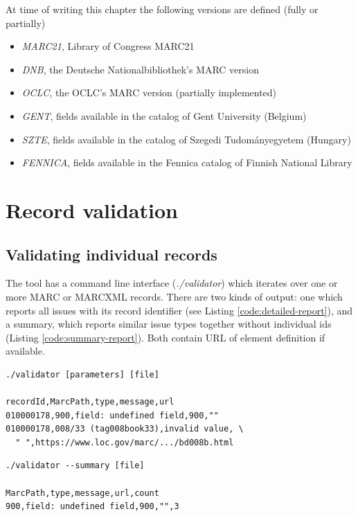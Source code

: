 At time of writing this chapter the following versions are defined (fully or partially)

\begin{itemize}
 \setlength{\parskip}{0pt}
 \setlength{\itemsep}{0pt plus 1pt}
  \item \emph{MARC21}, Library of Congress MARC21
  \item \emph{DNB}, the Deutsche Nationalbibliothek's MARC version
  \item \emph{OCLC}, the OCLC's MARC version (partially implemented)
  \item \emph{GENT}, fields available in the catalog of Gent University (Belgium)
  \item \emph{SZTE}, fields available in the catalog of Szegedi Tudományegyetem (Hungary)
  \item \emph{FENNICA}, fields available in the Fennica catalog of Finnish National Library
\end{itemize}


\section{Record validation}

\subsection{Validating individual records}

The tool has a command line interface (\emph{./validator}) which iterates over one or more MARC or MARCXML records. There are two kinds of output: one which reports all issues with its record identifier (see Listing \ref{code:detailed-report}), and a summary, which reports similar issue types together without individual ids (Listing \ref{code:summary-report}). Both contain URL of element definition if available.

\begin{lstlisting}[float, caption=Detailed report, label=code:detailed-report]
./validator [parameters] [file]

recordId,MarcPath,type,message,url
010000178,900,field: undefined field,900,""
010000178,008/33 (tag008book33),invalid value, \
  " ",https://www.loc.gov/marc/.../bd008b.html
\end{lstlisting}

\begin{lstlisting}[float, caption=Summarized report, label=code:summary-report]
./validator --summary [file]

MarcPath,type,message,url,count
900,field: undefined field,900,"",3
\end{lstlisting}

